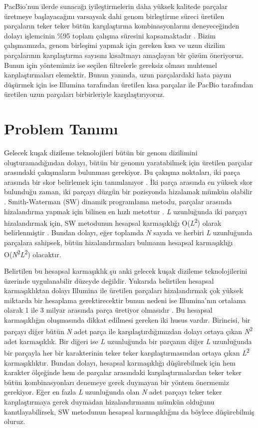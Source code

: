 PacBio'nun ilerde sunacağı iyileştirmelerin daha yüksek kalitede parçalar üretmeye başlayacağını varsaysak dahi genom birleştirme süreci üretilen parçaların teker teker bütün karşılaştırma kombinasyonlarını deneyeceğinden dolayı işlemcinin \%95 toplam çalışma süresini kapsamaktadır \cite{Berlin2015}. Bizim çalışmamızda, genom birleşimi yapmak için gereken kısa ve uzun dizilim parçalarının karşılaştırma sayısını kısaltmayı amaçlayan bir çözüm öneriyoruz. Bunun için yöntemimiz ise seçilen filtrelerle gereksiz olması muhtemel karşılaştırmaları elemektir. Bunun yanında, uzun parçalardaki hata payını düşürmek için ise Illumina tarafından üretilen kısa parçalar ile PacBio tarafından üretilen uzun parçaları birbirleriyle karşılaştırıyoruz.

\section{Problem Tanımı}

Gelecek kuşak dizileme teknolojileri bütün bir genom dizilimini oluşturamadığından dolayı, bütün bir genomu yaratabilmek için üretilen parçalar arasındaki çakışmaların bulunması gerekiyor. Bu çakışma noktaları, iki parça arasında bir skor belirlemek için tanımlanıyor \cite{Staden1980}. İki parça arasında en yüksek skor bulunduğu zaman, iki parçayı düzgün bir pozisyonda hizalamak mümkün olabilir \cite{Staden1980}. Smith-Waterman (SW) dinamik programlama metodu, parçalar arasında hizalandırma yapmak için bilinen en hızlı metottur \cite{Smith1981}. \textit{L} uzunluğunda iki parçayı hizalandırmak için, SW metodunun hesapsal karmaşıklığı O(\textit{L}\textsuperscript{2}) olarak belirlenmiştir \cite{Smith1981}. Bundan dolayı, eğer toplamda \textit{N} sayıda ve herbiri \textit{L} uzunluğunda parçalara sahipsek, bütün hizalandırmaları bulmanın hesapsal karmaşıklığı O(\textit{N}\textsuperscript{2}\textit{L}\textsuperscript{2}) olacaktır.

Belirtilen bu hesapsal karmaşıklık şu anki gelecek kuşak dizileme teknolojilerini üzerinde uygulanabilir düzeyde değildir. Yukarıda belirtilen hesapsal karmaşıklıktan dolayı Illumina ile üretilen parçaları hizalandırmak çok yüksek miktarda bir hesaplama gerektirecektir bunun nedeni ise Illumina'nın ortalama olarak 1 ile 3 milyar arasında parça üretiyor olmasıdır \cite{Metzker2010}. Bu hesapsal karmaşıklığın oluşmasında dikkat edilmesi gereken iki husus vardır. Birincisi, bir parçayı diğer bütün \textit{N} adet parça ile karşılaştırdığımızdan dolayı ortaya çıkan \textit{N}\textsuperscript{2} adet karmaşıklık. Bir diğeri ise \textit{L} uzunluğunda bir parçanın diğer \textit{L} uzunluğunda bir parçayla her bir karakterinin teker teker karşılaştırmasından ortaya çıkan \textit{L}\textsuperscript{2} karmaşıklıktır. Bundan dolayı, hesapsal karmaşıklığı düşürebilmek için hem karakter ölçeğinde hem de parçalar arasındaki karşılaştırmalardan teker teker bütün kombinasyonları denemeye gerek duymayan bir yöntem önermemiz gerekiyor. Eğer en fazla \textit{L} uzunluğunda olan \textit{N} adet parçayı teker teker karşılaştırmaya gerek duymadan hizalandırmanın mümkün olduğunu kanıtlayabilirsek, SW metodunun hesapsal karmaşıklığını da böylece düşürebilmiş oluruz.

